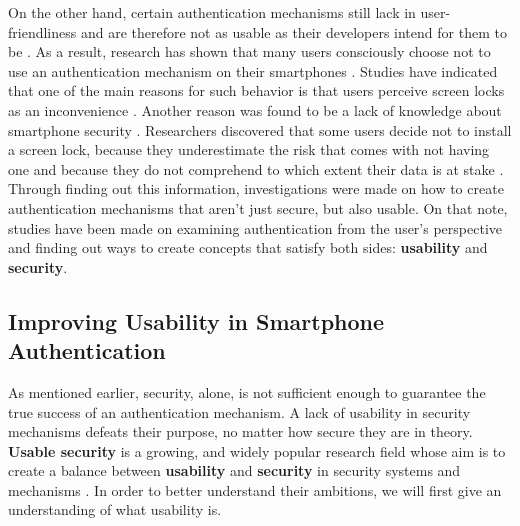 On the other hand, certain authentication mechanisms still lack in user-friendliness and are therefore not as usable as their developers intend for them to be \cite{Schloeglhofer}. As a result, research has shown that many users consciously choose not to use an authentication mechanism on their smartphones \cite{ediss20251, Albayram:2017:BUL:3235924.3235929, Egelman:2014:YRL:2660267.2660273}. Studies have indicated that one of the main reasons for such behavior is that users perceive screen locks as an inconvenience \cite{Albayram:2017:BUL:3235924.3235929, ediss20251, harbach}. Another reason was found to be a lack of knowledge about smartphone security \cite{Albayram:2017:BUL:3235924.3235929, Adams:1999:UE:322796.322806}. Researchers discovered that some users decide not to install a screen lock, because they underestimate the risk that comes with not having one and because they do not comprehend to which extent their data is at stake \cite{Egelman:2014:YRL:2660267.2660273}. Through finding out this information, investigations were made on how to create authentication mechanisms that aren't just secure, but also usable. On that note, studies have been made on examining authentication from the user's perspective and finding out ways to create concepts that satisfy both sides: \textbf{usability} and \textbf{security}.  


\subsection{Improving Usability in Smartphone Authentication}

As mentioned earlier, security, alone, is not sufficient enough to guarantee the true success of an authentication mechanism. A lack of usability in security mechanisms defeats their purpose, no matter how secure they are in theory. \textbf{Usable security} is a growing, and widely popular research field whose aim is to create a balance between \textbf{usability} and \textbf{security} in security systems and mechanisms \cite{Realpe-Munoz, anonymous}. In order to better understand their ambitions, we will first give an understanding of what usability is. \\

